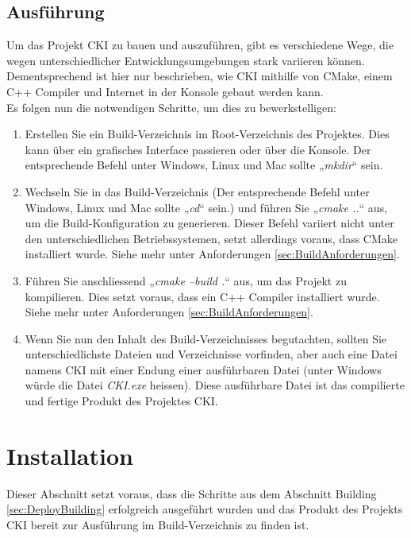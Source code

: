 \subsection{Ausführung}
\label{sec:BuildAusführung}
Um das Projekt CKI zu bauen und auszuführen, gibt es verschiedene Wege, die wegen unterschiedlicher Entwicklungsumgebungen stark variieren können. Dementsprechend ist hier nur beschrieben, wie CKI mithilfe von CMake, einem C++ Compiler und Internet in der Konsole gebaut werden kann.
\\
Es folgen nun die notwendigen Schritte, um dies zu bewerkstelligen:
\begin{enumerate}
	\item Erstellen Sie ein Build-Verzeichnis im Root-Verzeichnis des Projektes. Dies kann über ein grafisches Interface passieren oder über die Konsole. Der entsprechende Befehl unter Windows, Linux und Mac sollte „\textit{mkdir}“ sein.
	\item Wechseln Sie in das Build-Verzeichnis (Der entsprechende Befehl unter Windows, Linux und Mac sollte „\textit{cd}“ sein.) und führen Sie „\textit{cmake ..}“ aus, um die Build-Konfiguration zu generieren. Dieser Befehl variiert nicht unter den unterschiedlichen Betriebssystemen, setzt allerdings voraus, dass CMake installiert wurde. Siehe mehr unter Anforderungen \ref{sec:BuildAnforderungen}.
	\item Führen Sie anschliessend „\textit{cmake --build .}“ aus, um das Projekt zu kompilieren. Dies setzt voraus, dass ein C++ Compiler installiert wurde. Siehe mehr unter Anforderungen \ref{sec:BuildAnforderungen}.
	\item Wenn Sie nun den Inhalt des Build-Verzeichnisses begutachten, sollten Sie unterschiedlichste Dateien und Verzeichnisse vorfinden, aber auch eine Datei namens CKI mit einer Endung einer ausführbaren Datei (unter Windows würde die Datei \textit{CKI.exe} heissen). Diese ausführbare Datei ist das compilierte und fertige Produkt des Projektes CKI.
\end{enumerate}

\section{Installation}
Dieser Abschnitt setzt voraus, dass die Schritte aus dem Abschnitt Building \ref{sec:DeployBuilding} erfolgreich ausgeführt wurden und das Produkt des Projekts CKI bereit zur Ausführung im Build-Verzeichnis zu finden ist.
